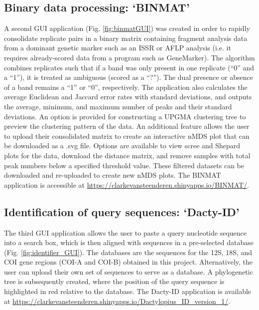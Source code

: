 \subsection{Binary data processing: `BINMAT'}
A second GUI application (Fig. \ref{fig:binmatGUI}) was created in order to rapidly consolidate replicate pairs in a binary matrix containing fragment analysis data from a dominant genetic marker such as an ISSR or AFLP analysis (i.e. it requires already-scored data from a program such as GeneMarker\textsuperscript{\textregistered}). The algorithm combines replicates such that if a band was only present in one replicate (``0'' and a ``1''), it is treated as ambiguous (scored as a ``?''). The dual presence or absence of a band remains a ``1'' or ``0'', respectively. The application also calculates the average Euclidean and Jaccard error rates with standard deviations, and outputs the average, minimum, and maximum number of peaks and their standard deviations. An option is provided for constructing a UPGMA clustering tree to preview the clustering pattern of the data.
An additional feature allows the user to upload their consolidated matrix to create an interactive nMDS plot that can be downloaded as a .svg file. Options are available to view scree and Shepard plots for the data, download the distance matrix, and remove samples with total peak numbers below a specified threshold value. These filtered datasets can be downloaded and re-uploaded to create new nMDS plots. 
The BINMAT application is accessible at \url{ https://clarkevansteenderen.shinyapps.io/BINMAT/}.

\subsection{Identification of query sequences: `Dacty-ID'}

The third GUI application allows the user to paste a query nucleotide sequence into a search box, which is then aligned with sequences in a pre-selected database (Fig. \ref{fig:identifier_GUI}). The databases are the sequences for the 12S, 18S, and COI gene regions (COI-A and COI-B) obtained in this project. Alternatively, the user can upload their own set of sequences to serve as a database. A phylogenetic tree is subsequently created, where the position of the query sequence is highlighted in red relative to the database. The Dacty-ID application is available at
\url{ https://clarkevansteenderen.shinyapps.io/Dactylopius_ID_version_1/}. 

